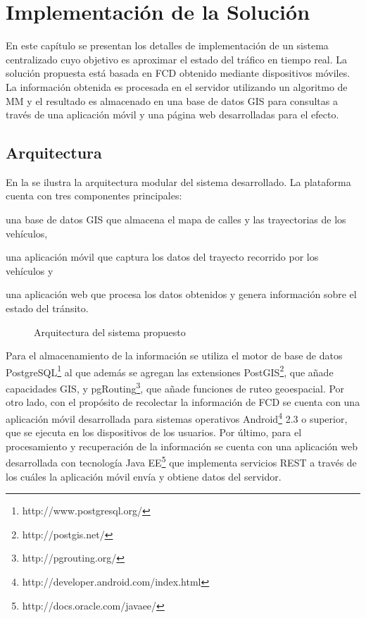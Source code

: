 \chapter{Implementación de la Solución}
\label{cap:6}

En este capítulo se presentan los detalles de implementación de un sistema centralizado cuyo objetivo es aproximar el estado del tráfico en tiempo real. La solución propuesta está basada en FCD obtenido mediante dispositivos móviles. La información obtenida es procesada en el servidor utilizando un algoritmo de MM y el resultado es almacenado en una base de datos GIS para consultas a través de una aplicación móvil y una página web desarrolladas para el efecto.

\section{Arquitectura}

En la  se ilustra la arquitectura modular del sistema desarrollado. La plataforma cuenta con tres componentes principales:
\begin{enumerate*}[1)] \item una base de datos GIS que almacena el mapa de calles y las trayectorias de los vehículos, \item una aplicación móvil que captura los datos del trayecto recorrido por los vehículos y \item una aplicación web que procesa los datos obtenidos y genera información sobre el estado del tránsito.
\end{enumerate*}

\begin{figure}[h]
	\centering
	
	\caption{\label{fig:arquitectura} Arquitectura del sistema propuesto}	
\end{figure}

Para el almacenamiento de la información se utiliza el motor de base de datos PostgreSQL\footnote{http://www.postgresql.org/} al que además se agregan las extensiones PostGIS\footnote{http://postgis.net/}, que añade capacidades GIS, y pgRouting\footnote{http://pgrouting.org/}, que añade funciones de ruteo geoespacial. Por otro lado, con el propósito de recolectar la información de FCD se cuenta con una aplicación móvil desarrollada para sistemas operativos Android\footnote{http://developer.android.com/index.html} 2.3 o superior, que se ejecuta en los dispositivos de los usuarios. Por último, para el procesamiento y recuperación de la información se cuenta con una aplicación web desarrollada con tecnología Java EE\footnote{http://docs.oracle.com/javaee/} que implementa servicios REST a través de los cuáles la aplicación móvil envía y obtiene datos del servidor.

